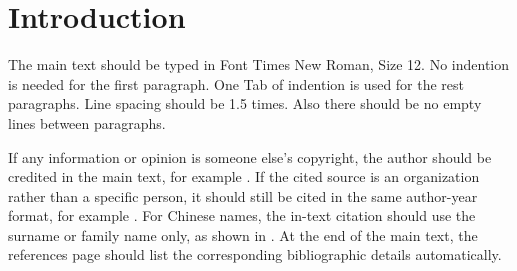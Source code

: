 
\chapter{Introduction}

The main text should be typed in Font Times New Roman, Size 12. No indention is needed for the first paragraph. One Tab of indention is used for the rest paragraphs. Line spacing should be 1.5 times. Also there should be no empty lines between paragraphs.

If any information or opinion is someone else's copyright, the author should be credited in the main text, for example \cite{smith2001taxation}. If the cited source is an organization rather than a specific person, it should still be cited in the same author-year format, for example \cite{worldbank2004income}. For Chinese names, the in-text citation should use the surname or family name only, as shown in \cite{liu2005income}. At the end of the main text, the references page should list the corresponding bibliographic details automatically.
